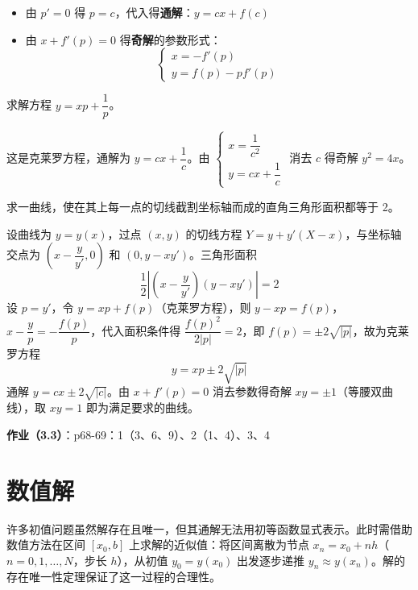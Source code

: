 \begin{itemize}
    \item 由 $p' = 0$ 得 $p = c$，代入得\textbf{通解}：$y = cx + f(c)$
    \item 由 $x + f'(p) = 0$ 得\textbf{奇解}的参数形式：
    $$\begin{cases} x = -f'(p) \\ y = f(p) - pf'(p) \end{cases}$$
\end{itemize}

\begin{example}
求解方程 $y = xp + \dfrac{1}{p}$。
\end{example}

\begin{solution}
这是克莱罗方程，通解为 $y = cx + \dfrac{1}{c}$。由 $\begin{cases} x = \dfrac{1}{c^2} \\ y = cx + \dfrac{1}{c} \end{cases}$ 消去 $c$ 得奇解 $y^2 = 4x$。
\end{solution}

\begin{example}
求一曲线，使在其上每一点的切线截割坐标轴而成的直角三角形面积都等于 2。
\end{example}

\begin{solution}
设曲线为 $y = y(x)$，过点 $(x,y)$ 的切线方程 $Y = y + y'(X - x)$，与坐标轴交点为 $(x - \dfrac{y}{y'}, 0)$ 和 $(0, y - xy')$。三角形面积
$$\frac{1}{2}\left|(x - \frac{y}{y'})(y - xy')\right| = 2$$
设 $p = y'$，令 $y = xp + f(p)$（克莱罗方程），则 $y - xp = f(p)$，$x - \dfrac{y}{p} = -\dfrac{f(p)}{p}$，代入面积条件得 $\dfrac{f(p)^2}{2|p|} = 2$，即 $f(p) = \pm 2\sqrt{|p|}$，故为克莱罗方程
$$y = xp \pm 2\sqrt{|p|}$$
通解 $y = cx \pm 2\sqrt{|c|}$。由 $x + f'(p) = 0$ 消去参数得奇解 $xy = \pm 1$（等腰双曲线），取 $xy = 1$ 即为满足要求的曲线。
\end{solution}

\textbf{作业（3.3）}：p68-69：1（3、6、9）、2（1、4）、3、4

\section{数值解}

许多初值问题虽然解存在且唯一，但其通解无法用初等函数显式表示。此时需借助数值方法在区间 $[x_0, b]$ 上求解的近似值：将区间离散为节点 $x_n = x_0 + nh$（$n = 0, 1, \ldots, N$，步长 $h$），从初值 $y_0 = y(x_0)$ 出发逐步递推 $y_n \approx y(x_n)$。解的存在唯一性定理保证了这一过程的合理性。

